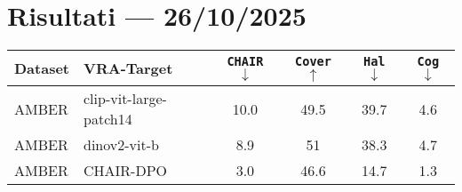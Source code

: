 \documentclass[a4paper,11pt]{article}
\begin{document}
	
	\section*{Risultati --- 26/10/2025}
	
	\begin{table}[h]
		\centering
		\begin{tabular}{ll|cccc}
			\toprule
			\textbf{Dataset} & \textbf{VRA-Target} & \texttt{CHAIR} $\downarrow$ & \texttt{Cover} $\uparrow$ & \texttt{Hal} $\downarrow$ & \texttt{Cog} $\downarrow$ \\
			\midrule
			AMBER & clip-vit-large-patch14 & \textcolor{red!90}{10.0} & \textcolor{red!90}{49.5} & \textcolor{red!90}{39.7} & \textcolor{green!50!black!50}{4.6} \\
			\midrule
			AMBER & dinov2-vit-b & \textcolor{green!50!black!50}{8.9} & \textcolor{green!50!black!50}{51} & \textcolor{green!50!black!50}{38.3} & \textcolor{red!90}{4.7} \\
			\midrule \midrule
			AMBER & CHAIR-DPO & 3.0 & 46.6 & 14.7 & 1.3 \\
			\bottomrule
		\end{tabular}
	\end{table}
	
\end{document}
